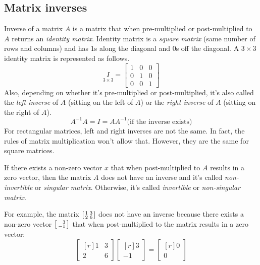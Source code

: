 \documentclass[../main.tex]{subfiles}
\begin{document}
\subsection{Matrix inverses}
Inverse of a matrix \(A\) is a matrix that when pre-multiplied or post-multiplied to \(A\) returns an \emph{identity matrix}. Identity matrix is a \emph{square matrix} (same number of rows and columns) and has \(1\)s along the diagonal and \(0\)s off the diagonal. A \(3 \times 3\) identity matrix is represented as follows.
\[
    \underset{3 \times 3}{I}
    =
    \begin{bmatrix}
        1 & 0 & 0 \\
        0 & 1 & 0 \\
        0 & 0 & 1
    \end{bmatrix}
\]
Also, depending on whether it's pre-multiplied or post-multiplied, it's also called the \emph{left inverse} of \(A\) (sitting on the left of \(A\)) or the \emph{right inverse} of \(A\) (sitting on the right of \(A\)).
\[
    A^{-1}A = I = AA^{-1} \text{(if the inverse exists)}
\]
For rectangular matrices, left and right inverses are not the same. In fact, the rules of matrix multiplication won't allow that. However, they are the same for square matrices.
\vspace{0.5em}

If there exists a non-zero vector \(x\) that when post-multiplied to \(A\) results in a zero vector, then the matrix \(A\) does not have an inverse and it's called \emph{non-invertible} or \emph{singular matrix}. Otherwise, it's called \emph{invertible} or \emph{non-singular matrix}.
\vspace{0.5em}

For example, the matrix \(\begin{bsmallmatrix} 1 & 3 \\ 2 & 6 \end{bsmallmatrix}\) does not have an inverse because there exists a non-zero vector \(\begin{bsmallmatrix*}[r] 3 \\ -1 \end{bsmallmatrix*}\) that when post-multiplied to the matrix results in a zero vector:
\[
    \begin{bmatrix*}[r]
        1 & 3 \\
        2 & 6
    \end{bmatrix*}
    \begin{bmatrix*}[r]
        3 \\
        -1
    \end{bmatrix*}
    =
    \begin{bmatrix*}[r]
        0 \\
        0
    \end{bmatrix*}
\]
\end{document}
